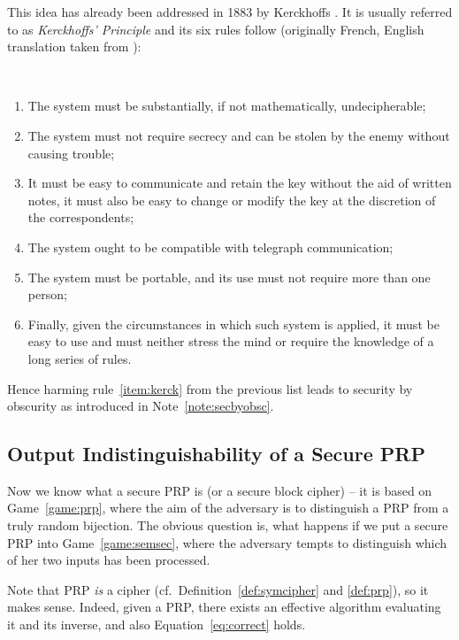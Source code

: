 This idea has already been addressed in 1883 by Kerckhoffs \cite{auguste1883cryptographie}. It is usually referred to as {\em Kerckhoffs' Principle} and its six rules follow (originally French, English translation taken from \cite{petitcolas2016kerckhoffs}):
\begin{princ}[Kerckhoffs]
	~
	\begin{enumerate}
		\item The system must be substantially, if not mathematically, undecipherable;
		\item The system must not require secrecy and can be stolen by the enemy without causing trouble;\label{item:kerck}
		\item It must be easy to communicate and retain the key without the aid of written notes, it must also be easy to change or modify the key at the discretion of the correspondents;
		\item The system ought to be compatible with telegraph communication;
		\item The system must be portable, and its use must not require more than one person;
		\item Finally, given the circumstances in which such system is applied, it must be easy to use and must neither stress the mind or require the knowledge of a long series of rules.
	\end{enumerate}
\end{princ}
Hence harming rule~\ref{item:kerck} from the previous list leads to security by obscurity as introduced in Note~\ref{note:secbyobsc}.



\subsection{Output Indistinguishability of a Secure PRP}

Now we know what a secure PRP is (or a secure block cipher) -- it is based on Game~\ref{game:prp}, where the aim of the adversary is to distinguish a PRP from a truly random bijection. The obvious question is, what happens if we put a secure PRP into Game~\ref{game:semsec}, where the adversary tempts to distinguish which of her two inputs has been processed.

Note that PRP {\em is} a cipher (cf.\ Definition~\ref{def:symcipher} and \ref{def:prp}), so it makes sense. Indeed, given a PRP, there exists an effective algorithm evaluating it and its inverse, and also Equation~\ref{eq:correct} holds.

